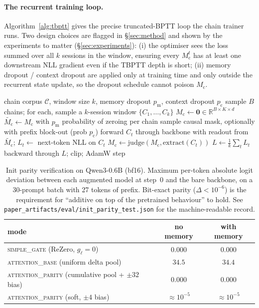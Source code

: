 \documentclass{article}
\newcommand{\Mc}{M_{\text{c}}}
\begin{document}
\paragraph{The recurrent training loop.}
Algorithm~\ref{alg:tbptt} gives the precise truncated-BPTT loop the
chain trainer runs. Two design choices are flagged in
\S\ref{sec:method} and shown by the experiments to matter
(\S\ref{sec:experiments}): (i) the optimiser sees the loss summed
over all $k$ sessions in the window, ensuring every $\Mc^t$ has at
least one downstream NLL gradient even if the TBPTT depth is short;
(ii) memory dropout / context dropout are applied only at training
time and only outside the recurrent state update, so the dropout
schedule cannot poison $\Mc$.

\begin{algorithm}[t]
\caption{Recurrent chain training step (one micro-batch).}
\label{alg:tbptt}
\begin{algorithmic}[1]
\Require chain corpus $\mathcal{C}$, window size $k$, memory dropout
$p_\text{m}$, context dropout $p_\text{c}$
\State sample $B$ chains; for each, sample a $k$-session window
$\{C_1, \dots, C_k\}$
\State $\Mc \gets \mathbf{0} \in \mathbb{R}^{B\times K\times d}$
  \State $\tilde{\Mc} \gets \Mc$ with $p_\text{m}$ probability of zeroing per chain
  \State sample causal mask, optionally with prefix block-out (prob $p_\text{c}$)
  \State forward $C_t$ through backbone with readout from $\tilde{\Mc}$;
         $L_t \gets$ next-token NLL on $C_t$
  \State $\Mc \gets \mathrm{judge}(\Mc, \mathrm{extract}(C_t))$
\EndFor
\State $L \gets \frac{1}{k} \sum_t L_t$
\State backward through $L$; clip; AdamW step
\end{algorithmic}
\end{algorithm}

\begin{table}[t]
\centering
\caption{Init parity verification on Qwen3-0.6B (bf16). Maximum
per-token absolute logit deviation between each augmented model at
step~0 and the bare backbone, on a 30-prompt batch with 27 tokens of
prefix. Bit-exact parity ($\Delta < 10^{-6}$) is the requirement for
``additive on top of the pretrained behaviour'' to hold. See
\texttt{paper\_artifacts/eval/init\_parity\_test.json} for the
machine-readable record.}
\label{tab:init_parity}
\begin{tabular}{lcc}
\toprule
mode & no memory & with memory \\
\midrule
\textsc{simple\_gate} (ReZero, $g_\ell{=}0$) & $0.000$ & $0.000$ \\
\textsc{attention\_base} (uniform delta pool)  & $34.5$ & $34.4$ \\
\textsc{attention\_parity} (cumulative pool + $\pm 32$ bias) & $0.000$ & $0.000$ \\
\textsc{attention\_parity} (soft, $\pm 4$ bias)              & $\approx 10^{-5}$ & $\approx 10^{-5}$ \\
\bottomrule
\end{tabular}
\end{table}
\end{document}
